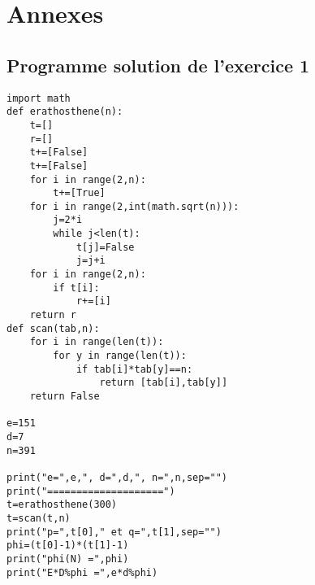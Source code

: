 \documentclass[10pt,a4paper,french]{article}
\newcounter{exercice}[section]
\begin{document}
\section{Annexes}
\subsection{Programme solution de l'exercice 1}\label{exo1}
\begin{lstlisting}
import math
def erathosthene(n):
    t=[]
    r=[]
    t+=[False]
    t+=[False]
    for i in range(2,n):
        t+=[True]
    for i in range(2,int(math.sqrt(n))):
        j=2*i
        while j<len(t):
            t[j]=False
            j=j+i
    for i in range(2,n):
        if t[i]:
            r+=[i]
    return r
def scan(tab,n):
    for i in range(len(t)):
        for y in range(len(t)):
            if tab[i]*tab[y]==n:
                return [tab[i],tab[y]]
    return False

e=151
d=7
n=391

print("e=",e,", d=",d,", n=",n,sep="")
print("====================")
t=erathosthene(300)
t=scan(t,n)
print("p=",t[0]," et q=",t[1],sep="")
phi=(t[0]-1)*(t[1]-1)
print("phi(N) =",phi)
print("E*D%phi =",e*d%phi)
\end{lstlisting}
\end{document}
